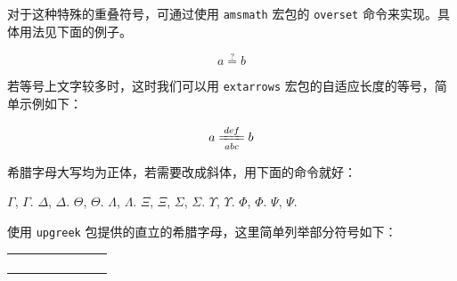 
对于这种特殊的重叠符号，可通过使用 \verb|amsmath| 宏包的 \verb|overset|
命令来实现。具体用法见下面的例子。
\begin{example}
\begin{equation}a\overset{?}{=}b\end{equation}
\end{example}

若等号上文字较多时，这时我们可以用 \verb|extarrows| 宏包的自适应长度的等号，简单示例如下：
\begin{example}
\begin{equation}
  a\xlongequal[abc]{def}b
\end{equation}
\end{example}

希腊字母大写均为正体，若需要改成斜体，用下面的命令就好：
\begin{example}
$\Gamma$, $\varGamma$. $\Delta$, $\varDelta$.
$\Theta$, $\varTheta$. $\Lambda$, $\varLambda$.
$\Xi$, $\varXi$, $\Sigma$,  $\varSigma$.
$\Upsilon$, $\varUpsilon$. $\Phi$, $\varPhi$.
$\Psi$, $\varPsi$.
\end{example}


使用 \verb|upgreek| 包提供的直立的希腊字母，这里简单列举部分符号如下：
\begin{center}
	\begin{tabular}{*4{ll}}
		\K{\upalpha}      & \K{\uptheta}      & \K{\uppi}         & \K{\upphi}        \\
		\K{\upbeta}       & \K{\upvartheta}   & \K{\upvarpi}      & \K{\upvarphi}     \\
		\K{\upgamma }     & \K{\upiota}       & \K{\uprho}        & \K{\upchi}        \\
		\K{\updelta}      & \K{\upkappa}      & \K{\upvarrho}     & \K{\uppsi}        \\
	\end{tabular}
\end{center}

